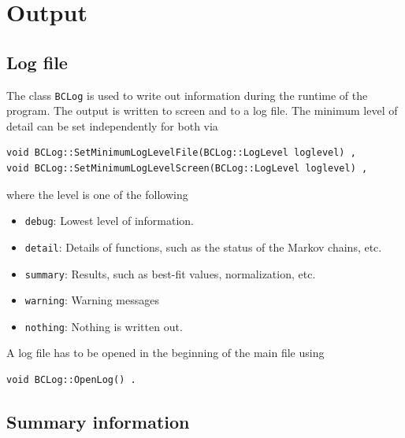 \documentclass[11pt, a4paper]{article}
\begin{document}

\section{Output}
\label{section:output}

\subsection{Log file}
\label{subsection:logfile}

The class \verb|BCLog| is used to write out information during the
runtime of the program. The output is written to screen and to a log
file. The minimum level of detail can be set independently for both
via
%
\begin{verbatim} 
void BCLog::SetMinimumLogLevelFile(BCLog::LogLevel loglevel) , 
void BCLog::SetMinimumLogLevelScreen(BCLog::LogLevel loglevel) , 
\end{verbatim} 
%
\noindent 
where the level is one of the following 
%
\begin{itemize} 
\item \verb|debug|: Lowest level of information. 
\item \verb|detail|: Details of functions, such as the status of the
  Markov chains, etc.
\item \verb|summary|: Results, such as best-fit values, normalization, etc. 
\item \verb|warning|: Warning messages 
\item \verb|nothing|: Nothing is written out. 
\end{itemize} 

A log file has to be opened in the beginning of the main file using
%
\begin{verbatim} 
void BCLog::OpenLog() . 
\end{verbatim} 


\subsection{Summary information}
\end{document}

